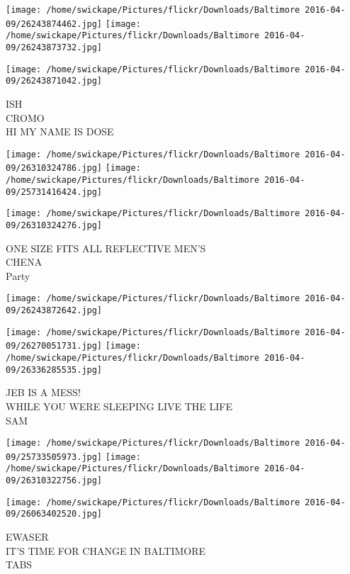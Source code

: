 \documentclass[10pt,letterpaper]{article}
\begin{document}
\texttt{[image: /home/swickape/Pictures/flickr/Downloads/Baltimore 2016-04-09/26243874462.jpg]}
\texttt{[image: /home/swickape/Pictures/flickr/Downloads/Baltimore 2016-04-09/26243873732.jpg]}

\vspace{0.25in}
\texttt{[image: /home/swickape/Pictures/flickr/Downloads/Baltimore 2016-04-09/26243871042.jpg]}

ISH\\
CROMO\\
HI MY NAME IS DOSE
\pagebreak

\texttt{[image: /home/swickape/Pictures/flickr/Downloads/Baltimore 2016-04-09/26310324786.jpg]}
\texttt{[image: /home/swickape/Pictures/flickr/Downloads/Baltimore 2016-04-09/25731416424.jpg]}

\vspace{0.25in}
\texttt{[image: /home/swickape/Pictures/flickr/Downloads/Baltimore 2016-04-09/26310324276.jpg]}

ONE SIZE FITS ALL REFLECTIVE MEN'S\\
CHENA\\
Party
\pagebreak

\texttt{[image: /home/swickape/Pictures/flickr/Downloads/Baltimore 2016-04-09/26243872642.jpg]}

\vspace{0.25in}
\texttt{[image: /home/swickape/Pictures/flickr/Downloads/Baltimore 2016-04-09/26270051731.jpg]}
\texttt{[image: /home/swickape/Pictures/flickr/Downloads/Baltimore 2016-04-09/26336285535.jpg]}

JEB IS A MESS!\\
WHILE YOU WERE SLEEPING LIVE THE LIFE\\
SAM
\pagebreak

\texttt{[image: /home/swickape/Pictures/flickr/Downloads/Baltimore 2016-04-09/25733505973.jpg]}
\texttt{[image: /home/swickape/Pictures/flickr/Downloads/Baltimore 2016-04-09/26310322756.jpg]}

\texttt{[image: /home/swickape/Pictures/flickr/Downloads/Baltimore 2016-04-09/26063402520.jpg]}

EWASER\\
IT'S TIME FOR CHANGE IN BALTIMORE\\
TABS
\pagebreak
\end{document}
